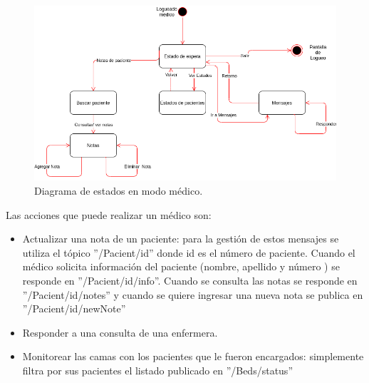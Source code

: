 \begin{figure}[ht]
	\centering
	\includegraphics[scale=.50]{./Figures/app/modo-medico.png}
	\caption{ Diagrama de estados en modo médico.}
	\label{fig: Diagrama de estados en modo médico.}
\end{figure} 

Las acciones que puede realizar un médico son:
\begin{itemize}
\item Actualizar una nota de un paciente: para la gestión de estos mensajes se utiliza el tópico ''/Pacient/id'' donde id es el número de paciente. Cuando el médico solicita información del paciente (nombre, apellido y número ) se responde  en ''/Pacient/id/info''. Cuando se consulta las notas se responde en ''/Pacient/id/notes'' y cuando se quiere ingresar una nueva nota se publica en ''/Pacient/id/newNote''
\item Responder a una consulta de una enfermera.
\item Monitorear las camas con los pacientes que le fueron encargados: simplemente filtra por sus pacientes el listado publicado en ''/Beds/status''

\end{itemize}


